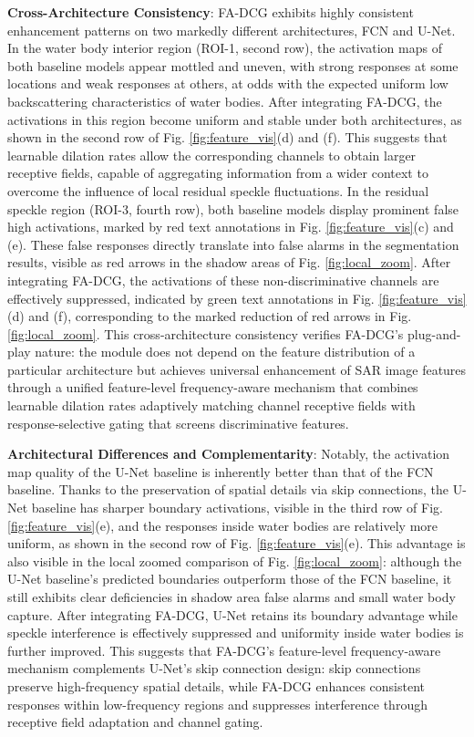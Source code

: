 \documentclass[lettersize,journal]{IEEEtran}
\begin{document}
\textbf{Cross-Architecture Consistency}: FA-DCG exhibits highly consistent enhancement patterns on two markedly different architectures, FCN and U-Net. In the water body interior region (ROI-1, second row), the activation maps of both baseline models appear mottled and uneven, with strong responses at some locations and weak responses at others, at odds with the expected uniform low backscattering characteristics of water bodies. After integrating FA-DCG, the activations in this region become uniform and stable under both architectures, as shown in the second row of Fig. \ref{fig:feature_vis}(d) and (f). This suggests that learnable dilation rates allow the corresponding channels to obtain larger receptive fields, capable of aggregating information from a wider context to overcome the influence of local residual speckle fluctuations. In the residual speckle region (ROI-3, fourth row), both baseline models display prominent false high activations, marked by red text annotations in Fig. \ref{fig:feature_vis}(c) and (e). These false responses directly translate into false alarms in the segmentation results, visible as red arrows in the shadow areas of Fig. \ref{fig:local_zoom}. After integrating FA-DCG, the activations of these non-discriminative channels are effectively suppressed, indicated by green text annotations in Fig. \ref{fig:feature_vis}(d) and (f), corresponding to the marked reduction of red arrows in Fig. \ref{fig:local_zoom}. This cross-architecture consistency verifies FA-DCG's plug-and-play nature: the module does not depend on the feature distribution of a particular architecture but achieves universal enhancement of SAR image features through a unified feature-level frequency-aware mechanism that combines learnable dilation rates adaptively matching channel receptive fields with response-selective gating that screens discriminative features.

\textbf{Architectural Differences and Complementarity}: Notably, the activation map quality of the U-Net baseline is inherently better than that of the FCN baseline. Thanks to the preservation of spatial details via skip connections, the U-Net baseline has sharper boundary activations, visible in the third row of Fig. \ref{fig:feature_vis}(e), and the responses inside water bodies are relatively more uniform, as shown in the second row of Fig. \ref{fig:feature_vis}(e). This advantage is also visible in the local zoomed comparison of Fig. \ref{fig:local_zoom}: although the U-Net baseline's predicted boundaries outperform those of the FCN baseline, it still exhibits clear deficiencies in shadow area false alarms and small water body capture. After integrating FA-DCG, U-Net retains its boundary advantage while speckle interference is effectively suppressed and uniformity inside water bodies is further improved. This suggests that FA-DCG's feature-level frequency-aware mechanism complements U-Net's skip connection design: skip connections preserve high-frequency spatial details, while FA-DCG enhances consistent responses within low-frequency regions and suppresses interference through receptive field adaptation and channel gating.
\end{document}
